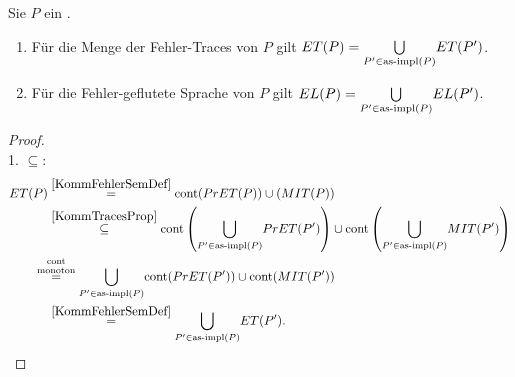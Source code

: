 \begin{Prop}
  \label{KommSemProp}
  Sie $P$ ein \MEIO{}.
  \begin{enumerate}
    \item Für die Menge der Fehler-Traces von $P$ gilt $ET (P) =
      \underset{P'\in\mathrm{as}\text{-}\mathrm{impl} (P)}{\bigcup} ET (P')$.
    \item Für die Fehler-geflutete Sprache von $P$ gilt $EL (P) =
      \underset{P'\in\mathrm{as}\text{-}\mathrm{impl} (P)}{\bigcup} EL (P')$.
  \end{enumerate}
\end{Prop}
\begin{proof}\mbox{}\\
  1. \glqq$\subseteq$\grqq{}:
  \begin{align*}
    \ET (P)&\overset{\ref{KommFehlerSemDef}}{=} \cont (\PrET (P))\cup (\MIT
    (P))\\
    &\overset{\ref{KommTracesProp}}{\subseteq} \cont
    \left(\underset{P'\in\asimp (P)}{\bigcup} \PrET (P')\right)\cup \cont
    \left(\underset{P'\in\asimp (P)}{\bigcup} \MIT (P')\right)\\
    &\hspace{-0.4cm}\overset{\cont}{\overset{\text{monoton}}{=}} \underset{P'\in\asimp
    (P)}{\bigcup} \cont (\PrET (P'))\cup \cont (\MIT (P'))\\
    &\overset{\ref{KommFehlerSemDef}}{=} \underset{P'\in\asimp
    (P)}{\bigcup} \ET (P').\\
  \end{align*}


\end{proof}

